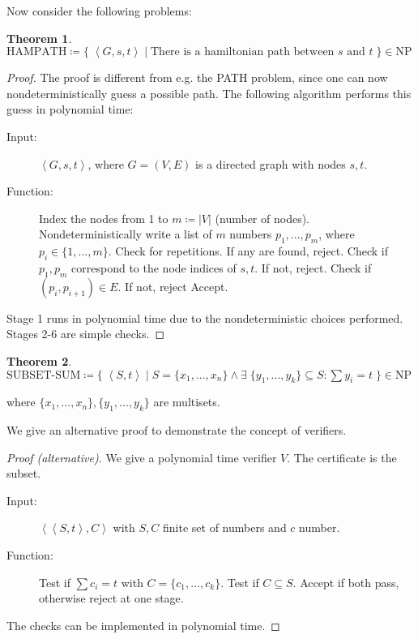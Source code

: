 \documentclass[10pt,fleqn]{article}
\theoremstyle{definition}
\newtheorem{theorem}{Theorem}
\theoremstyle{remark}
\newcommand{\npclass}{\text{NP}}
\newcommand{\hampathprob}{\text{HAMPATH}}
\newcommand{\subsetsumprob}{\text{SUBSET-SUM}}
\newcommand{\lpp}{\left \langle}
\newcommand{\rpp}{\right \rangle}
\newcommand{\enc}[1]{\lpp #1 \rpp}
\begin{document}
Now consider the following problems:
\begin{theorem}
    \(
    \hampathprob \coloneqq \{ \; \enc{G, s, t} \mid \text{There is a hamiltonian path between } s \text{ and } t \; \} \in \npclass
    \)
\end{theorem}
\begin{proof} The proof is different from e.g. the PATH problem, since one can now nondeterministically guess a possible path. The following algorithm performs this guess in polynomial time:

    \begin{description}
        \item[Input:] \(\enc{G, s, t}\), where \(G = (V, E)\) is a directed graph with nodes \(s, t\).
        \item[Function:] \phantom{}
              \begin{algorithmic}[1]
                  \State Index the nodes from 1 to \(m \coloneqq |V|\) (number of nodes). Nondeterministically write a list of \(m\) numbers \(p_1, ..., p_m\), where \(p_i \in \{1, ..., m\}\).
                  \State Check for repetitions. If any are found, reject.
                  \State Check if \(p_1, p_m\) correspond to the node indices of \(s, t\). If not, reject.
                  \State Check if \((p_i, p_{i+1}) \in E\). If not, reject
                  \EndFor
                  \State Accept.
              \end{algorithmic}
    \end{description}
    Stage 1 runs in polynomial time due to the nondeterministic choices performed. Stages 2-6 are simple checks.
\end{proof}
\begin{theorem}
    \(
    \subsetsumprob \coloneqq \{\; \enc{S, t} \mid S = \{x_1, ..., x_n\} \land \exists \; \{y_1,...,y_k\} \subseteq S\colon \textstyle\sum y_i = t  \;\} \in \npclass
    \)

    where \(\{x_1, ..., x_n\}, \{y_1, ..., y_k\}\) are multisets.
\end{theorem}
We give an alternative proof to demonstrate the concept of verifiers.
\begin{proof}[Proof (alternative)] We give a polynomial time verifier \(V\). The certificate is the subset.
    \begin{description}
        \item[Input:] \(\enc{\enc{S, t}, C}\) with \(S, C\) finite set of numbers and \(c\) number.
        \item[Function:] \phantom{}
              \begin{algorithmic}[1]
                  \State Test if \(\textstyle\sum c_i = t\) with \(C = \{c_1, ..., c_k\}\).
                  \State Test if \(C \subseteq S\).
                  \State Accept if both pass, otherwise reject at one stage.
              \end{algorithmic}
    \end{description}
    The checks can be implemented in polynomial time.
\end{proof}
\end{document}
